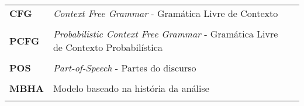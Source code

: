 
\begin{longtable}{llp{12cm}}
{\bf CFG}     &   \emph{Context Free Grammar} - Gramática Livre de Contexto  \\ \\
{\bf PCFG}    &   \emph{Probabilistic Context Free Grammar} - Gramática Livre de Contexto Probabilística\\ \\
{\bf POS}     &   \emph{Part-of-Speech} - Partes do discurso\\ \\
{\bf MBHA}    &   Modelo baseado na história da análise\\ \\
\end{longtable}
